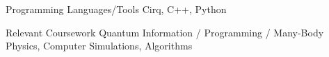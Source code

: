 


\begin{cvskills}

  \cvskill
    {Programming Languages/Tools}
    {Cirq, C++, Python}


  \cvskill 
    {Relevant Coursework}
    {Quantum Information / Programming / Many-Body Physics, Computer Simulations, Algorithms}


\end{cvskills}
